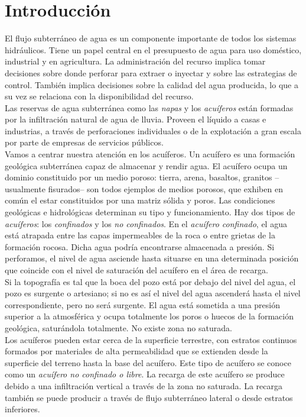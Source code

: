 \documentclass[10pt,a4paper,final]{article}
\begin{document}
\section{Introducción}
El flujo subterráneo de agua es un componente importante de todos los sistemas hidráulicos. Tiene un papel central en el presupuesto de agua para uso doméstico, industrial y en agricultura. La administración del recurso implica tomar decisiones sobre donde perforar para extraer o inyectar y sobre las estrategias de control. También implica decisiones sobre la calidad del agua producida, lo que a su vez se relaciona con la disponibilidad del recurso.\\
Las reservas de agua subterránea como las \emph{napas} y los \emph{acuíferos} están formadas por la infiltración natural de agua de lluvia. Proveen el líquido a casas e industrias, a través de perforaciones individuales o de la explotación a gran escala por parte de empresas de servicios públicos.\\
Vamos a centrar nuestra atención en los acuíferos. Un acuífero es una formación geológica subterránea capaz de almacenar y rendir agua. El acuífero ocupa un dominio constituido por un medio poroso: tierra, arena, basaltos, granitos –usualmente fisurados– son todos ejemplos de medios porosos, que exhiben en común el estar constituidos por una matriz sólida y poros. Las condiciones geológicas e hidrológicas determinan su tipo y funcionamiento. Hay dos tipos de \emph{acuíferos}: los \emph{confinados} y los \emph{no confinados}. En el \emph{acuífero confinado}, el agua está atrapada entre las capas impermeables de la roca o entre grietas de la formación rocosa. Dicha agua podría encontrarse almacenada a presión. Si perforamos, el nivel de agua asciende hasta situarse en una determinada posición que coincide con el nivel de saturación del acuífero en el área de recarga.\\
Si la topografía es tal que la boca del pozo está por debajo del nivel del agua, el pozo es
surgente o artesiano; si no es así el nivel del agua ascenderá hasta el nivel correspondiente, pero no será surgente. El agua está sometida a una presión superior a la atmosférica y ocupa totalmente los poros o huecos de la formación geológica, saturándola totalmente. No existe zona no saturada. \\
Los acuíferos pueden estar cerca de la superficie terrestre, con estratos continuos formados por materiales de alta permeabilidad que se extienden desde la superficie del terreno hasta la base del acuífero. Este tipo de acuífero se conoce como un \emph{acuífero no confinado o libre}. La recarga de este acuífero se produce debido a una infiltración vertical a través de la zona no saturada. La recarga también se puede producir a través de flujo subterráneo lateral o desde estratos inferiores.\\
\end{document}
